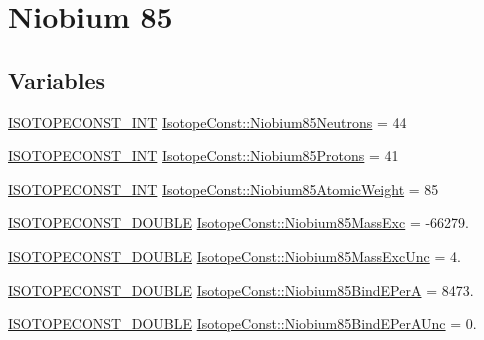\hypertarget{group___isotope_const-_niobium-_nb85}{}\section{Niobium 85}
\label{group___isotope_const-_niobium-_nb85}
\subsection*{Variables}
\begin{DoxyCompactItemize}
\item 
\mbox{\hyperlink{group___isotope_const-_macros_ga5f18360b3e99483a35c32d789e62621c}{I\+S\+O\+T\+O\+P\+E\+C\+O\+N\+S\+T\+\_\+\+I\+NT}} \mbox{\hyperlink{group___isotope_const-_niobium-_nb85_ga7127075cfdabb7a713f590aa9651a2ce}{Isotope\+Const\+::\+Niobium85\+Neutrons}} = 44
\item 
\mbox{\hyperlink{group___isotope_const-_macros_ga5f18360b3e99483a35c32d789e62621c}{I\+S\+O\+T\+O\+P\+E\+C\+O\+N\+S\+T\+\_\+\+I\+NT}} \mbox{\hyperlink{group___isotope_const-_niobium-_nb85_ga234a2fb9e29d169794267fbfe3e3e28e}{Isotope\+Const\+::\+Niobium85\+Protons}} = 41
\item 
\mbox{\hyperlink{group___isotope_const-_macros_ga5f18360b3e99483a35c32d789e62621c}{I\+S\+O\+T\+O\+P\+E\+C\+O\+N\+S\+T\+\_\+\+I\+NT}} \mbox{\hyperlink{group___isotope_const-_niobium-_nb85_gaba13ec75951e0b4237215cba9e74595d}{Isotope\+Const\+::\+Niobium85\+Atomic\+Weight}} = 85
\item 
\mbox{\hyperlink{group___isotope_const-_macros_ga8f45a7272ce02c0b4c65c44636ed719a}{I\+S\+O\+T\+O\+P\+E\+C\+O\+N\+S\+T\+\_\+\+D\+O\+U\+B\+LE}} \mbox{\hyperlink{group___isotope_const-_niobium-_nb85_ga5b08a8a03b8d87eed7e7b857cc8b61ff}{Isotope\+Const\+::\+Niobium85\+Mass\+Exc}} = -\/66279.
\item 
\mbox{\hyperlink{group___isotope_const-_macros_ga8f45a7272ce02c0b4c65c44636ed719a}{I\+S\+O\+T\+O\+P\+E\+C\+O\+N\+S\+T\+\_\+\+D\+O\+U\+B\+LE}} \mbox{\hyperlink{group___isotope_const-_niobium-_nb85_ga4ec47d93d8cc492e999650258195bc5c}{Isotope\+Const\+::\+Niobium85\+Mass\+Exc\+Unc}} = 4.
\item 
\mbox{\hyperlink{group___isotope_const-_macros_ga8f45a7272ce02c0b4c65c44636ed719a}{I\+S\+O\+T\+O\+P\+E\+C\+O\+N\+S\+T\+\_\+\+D\+O\+U\+B\+LE}} \mbox{\hyperlink{group___isotope_const-_niobium-_nb85_gad8e0adfa26e550c66d6da2d9facdeae9}{Isotope\+Const\+::\+Niobium85\+Bind\+E\+PerA}} = 8473.
\item 
\mbox{\hyperlink{group___isotope_const-_macros_ga8f45a7272ce02c0b4c65c44636ed719a}{I\+S\+O\+T\+O\+P\+E\+C\+O\+N\+S\+T\+\_\+\+D\+O\+U\+B\+LE}} \mbox{\hyperlink{group___isotope_const-_niobium-_nb85_ga2a0e9a1452a5dd85ce94f81daba3718d}{Isotope\+Const\+::\+Niobium85\+Bind\+E\+Per\+A\+Unc}} = 0.

\end{DoxyCompactItemize}
